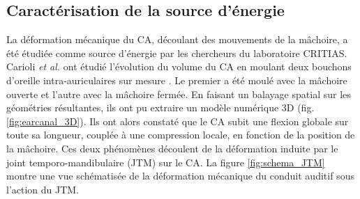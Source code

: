	\subsection{Caractérisation de la source d'énergie}
	\label{subsec:1.3.1_Caracterisation la source d energie}
La déformation mécanique du CA, découlant des mouvements de la mâchoire, a été étudiée comme source d'énergie par les chercheurs du laboratoire CRITIAS. Carioli \emph{et al.} ont étudié  l'évolution du volume du CA en moulant deux bouchons d'oreille intra-auriculaires sur mesure \cite{Carioli2016}. Le premier a été moulé avec la mâchoire ouverte et l'autre avec la mâchoire fermée. En faisant un balayage spatial sur les géométries résultantes, ils ont pu extraire un modèle numérique 3D (fig. \ref{fig:earcanal_3D}). Ils ont alors constaté que le CA subit une flexion globale sur toute sa longueur, couplée à une compression locale, en fonction de la position de la mâchoire. Ces deux phénomènes découlent de la déformation induite par le joint temporo-mandibulaire (JTM) sur le CA. La figure \ref{fig:schema_JTM} montre une vue schématisée de la déformation mécanique du conduit auditif sous l'action du JTM.
